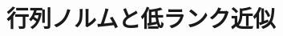 \documentclass[../../topic_linear-algebra]{subfiles}
\begin{document}
\chapter{行列ノルムと低ランク近似}



\end{document}
